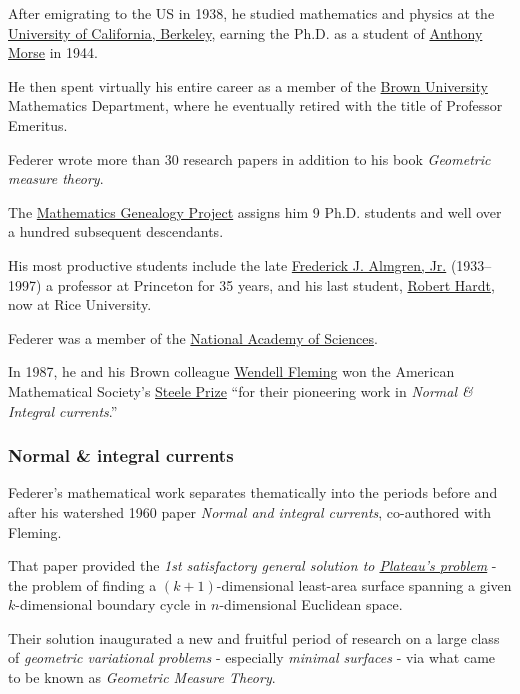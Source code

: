 \documentclass{article}
\begin{document}
After emigrating to the US in 1938, he studied mathematics and physics at the \href{https://en.wikipedia.org/wiki/University_of_California,_Berkeley}{University of California, Berkeley}, earning the Ph.D. as a student of \href{https://en.wikipedia.org/wiki/Anthony_Morse}{Anthony Morse} in 1944.

He then spent virtually his entire career as a member of the \href{https://en.wikipedia.org/wiki/Brown_University}{Brown University} Mathematics Department, where he eventually retired with the title of Professor Emeritus.

%
Federer wrote more than 30 research papers in addition to his book \textit{Geometric measure theory}.

The \href{https://en.wikipedia.org/wiki/Mathematics_Genealogy_Project}{Mathematics Genealogy Project} assigns him 9 Ph.D. students and well over a hundred subsequent descendants.

His most productive students include the late \href{https://en.wikipedia.org/wiki/Frederick_J._Almgren,_Jr.}{Frederick J. Almgren, Jr.} (1933--1997) a professor at Princeton for 35 years, and his last student, \href{https://en.wikipedia.org/wiki/Robert_Miller_Hardt}{Robert Hardt}, now at Rice University.

%
Federer was a member of the \href{https://en.wikipedia.org/wiki/United_States_National_Academy_of_Sciences}{National Academy of Sciences}.

In 1987, he and his Brown colleague \href{https://en.wikipedia.org/wiki/Wendell_Fleming}{Wendell Fleming} won the American Mathematical Society's \href{https://en.wikipedia.org/wiki/Steele_Prize}{Steele Prize} ``for their pioneering work in \textit{Normal \& Integral currents}.''

\subsubsection{Normal \& integral currents}
Federer's mathematical work separates thematically into the periods before and after his watershed 1960 paper \textit{Normal and integral currents}, co-authored with Fleming.

That paper provided the \textit{1st satisfactory general solution to \href{https://en.wikipedia.org/wiki/Plateau's_problem}{Plateau's problem}} - the problem of finding a $(k + 1)$-dimensional least-area surface spanning a given $k$-dimensional boundary cycle in $n$-dimensional Euclidean space.

Their solution inaugurated a new and fruitful period of research on a large class of \textit{geometric variational problems} - especially \textit{minimal surfaces} - via what came to be known as \textit{Geometric Measure Theory}.
\end{document}
